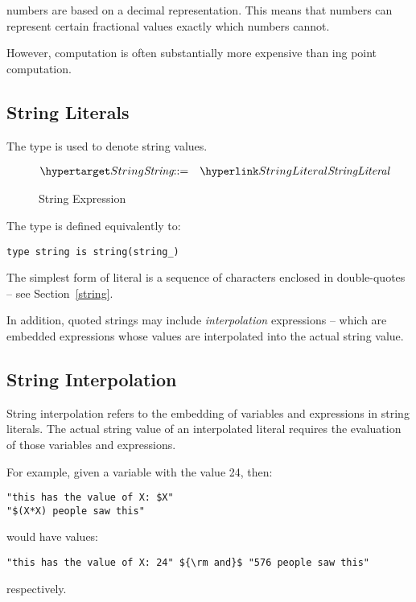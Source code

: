 \begin{aside}
 numbers are based on a decimal representation. This means that  numbers can represent certain fractional values exactly which  numbers cannot.

However,  computation is often substantially more expensive than ing point computation.
\end{aside}

\subsection{String Literals}
\label{stringType}

The  type is used to denote string values.

\begin{figure}[htbp]
\begin{eqnarray*}
\ntDef{String}&\arrow&\ntRef{StringLiteral}
\end{eqnarray*}
\caption{String Expression}\label{stringInterpolationFig}
\end{figure}

The  type is defined equivalently to:
\begin{lstlisting}
type string is string(string_)
\end{lstlisting}
The simplest form of  literal is a sequence of characters enclosed in double-quotes -- see Section~\vref{string}.

In addition, quoted strings may include \emph{interpolation} expressions -- which are embedded expressions whose values are interpolated into the actual string value.

\subsection{String Interpolation}
\label{StringInterpolation}
String interpolation refers to the embedding of variables and expressions in string literals. The actual string value of an interpolated  literal requires the evaluation of those variables and expressions.

For example, given a variable  with the value 24, then:
\begin{lstlisting}
"this has the value of X: $X"
"$(X*X) people saw this"
\end{lstlisting}
would have values:
\begin{lstlisting}[mathescape=true]
"this has the value of X: 24" ${\rm and}$ "576 people saw this"
\end{lstlisting}
respectively.

